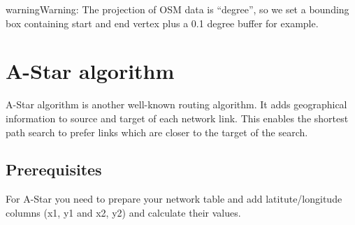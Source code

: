 \documentclass[a4paper,10pt,english]{manual}
\begin{document}
\begin{notice}{warning}{Warning:}
The projection of OSM data is ``degree'', so we set a bounding box containing start and end vertex plus a 0.1 degree buffer for example.
\end{notice}


\section{A-Star algorithm}

A-Star algorithm is another well-known routing algorithm. It adds geographical information to source and target of each network link. This enables the shortest path search to prefer links which are closer to the target of the search.


\subsection{Prerequisites}

For A-Star you need to prepare your network table and add latitute/longitude columns (x1, y1 and x2, y2) and calculate their values.
\end{document}
